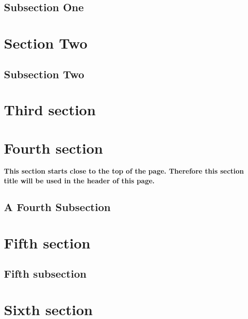 \documentclass{article}
\begin{document}
\subsection{Subsection One}

 \lipsum[1-2]

\section{Section Two}

 \lipsum[3]

\subsection{Subsection Two}
\label{sec:inherited}

 \lipsum[4-7]

\section{Third section}

\lipsum[1-2]

\section{Fourth section}
\label{sec:missing}

{\bfseries This section starts close to the top of the page. Therefore this section title will be used in the header of this page.}

\medskip

\lipsum[3-4]

\subsection{A Fourth Subsection}

\lipsum[7-9]

\section{Fifth section}

\lipsum[1-5]

\subsection{Fifth subsection}

\lipsum[8-10]

\section{Sixth section}
\label{sec:push}
\end{document}
